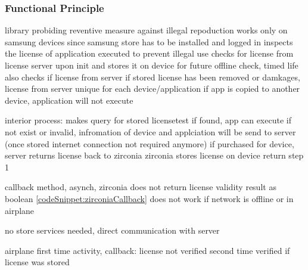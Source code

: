 \subsubsection{Functional Principle} \label{section:license-samsung-functional}

library probiding reventive measure against illegal repoduction
works only on samsung devices since samsung store has to be installed and logged in
inspects the license of application executed to prevent illegal use
checks for license from license server upon init and stores it on device for future offline check, timed life
also checks if license from server if stored license has been removed or damkages, license from server unique for each device/application
if app is copied to another device, application will not execute

interior process:
makes query for stored licensetest
if found, app can execute
if not exist or invalid, infromation of device and applciation will be send to server (once stored internet connection not required anymore)
if purchased for device, server returns license back to zirconia
zirconia stores license on device
return step 1

callback method, asynch, zirconia does not return license validity result as boolean \ref{codeSnippet:zirconiaCallback}
does not work if network is offline or in airplane

\cite{samsungZirconia}
%



no store services needed, direct communication with server

airplane
first time
activity, callback: license not verified
second time
verified if license was stored
